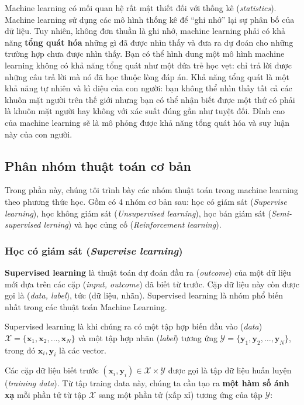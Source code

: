 \documentclass[../main-report.tex]{subfiles}
\begin{document}
Machine learning có mối quan hệ rất mật thiết đối với thống kê (\textit{statistics}). Machine learning sử dụng các mô hình thống kê để ``ghi nhớ'' lại sự phân bố của dữ liệu. Tuy nhiên, không đơn thuần là ghi nhớ, machine learning phải có khả năng \textbf{tổng quát hóa} những gì đã được nhìn thấy và đưa ra dự đoán cho những trường hợp chưa được nhìn thấy. Bạn có thể hình dung một mô hình machine learning không có khả năng tổng quát như một đứa trẻ học vẹt: chỉ trả lời được những câu trả lời mà nó đã học thuộc lòng đáp án. Khả năng tổng quát là một khả năng tự nhiên và kì diệu của con người: bạn không thể nhìn thấy tất cả các khuôn mặt người trên thế giới nhưng bạn có thể nhận biết được một thứ có phải là khuôn mặt người hay không với xác suất đúng gần như tuyệt đối. Đỉnh cao của machine learning sẽ là mô phỏng được khả năng tổng quát hóa và suy luận này của con người.

\subsection{Phân nhóm thuật toán cơ bản}
Trong phần này, chúng tôi trình bày các nhóm thuật toán trong machine learning theo phương thức học. Gồm có 4 nhóm cơ bản sau: học có giám sát (\emph{Supervise learning}), học không giám sát (\emph{Unsupervised learning}), học bán giám sát (\emph{Semi-supervised lerning}) và học củng cố (\emph{Reinforcement learning}).

\subsubsection*{Học có giám sát (\emph{Supervise learning})}
\textbf{Supervised learning} là thuật toán dự đoán đầu ra (\emph{outcome}) của một dữ liệu mới dựa trên các cặp (\emph{input, outcome}) đã biết từ trước. Cặp dữ liệu này còn được gọi là (\emph{data, label}), tức (dữ liệu, nhãn). Supervised learning là nhóm phổ biến nhất trong các thuật toán Machine Learning.

Supervised learning là khi chúng ra có một tập hợp biến đầu vào (\emph{data}) \( \mathcal{X} = \{\mathbf{x}_1, \mathbf{x}_2, \dots, \mathbf{x}_N\} \) và một tập hợp nhãn (\emph{label}) tương ứng \( \mathcal{Y} = \{\mathbf{y}_1, \mathbf{y}_2, \dots, \mathbf{y}_N\} \), trong đó \( \mathbf{x}_i, \mathbf{y}_i \) là các vector. 

Các cặp dữ liệu biết trước \( (\mathbf{x}_i, \mathbf{y}_i) \in \mathcal{X} \times \mathcal{Y} \) 
được gọi là tập dữ liệu huấn luyện (\emph{training data}). Từ tập traing data này, chúng ta cần tạo ra \textbf{một hàm số ánh xạ} mỗi phần tử từ tập \(\mathcal{X}\) sang một phần tử (xấp xỉ) tương ứng của tập \(\mathcal{Y}\):
\end{document}
